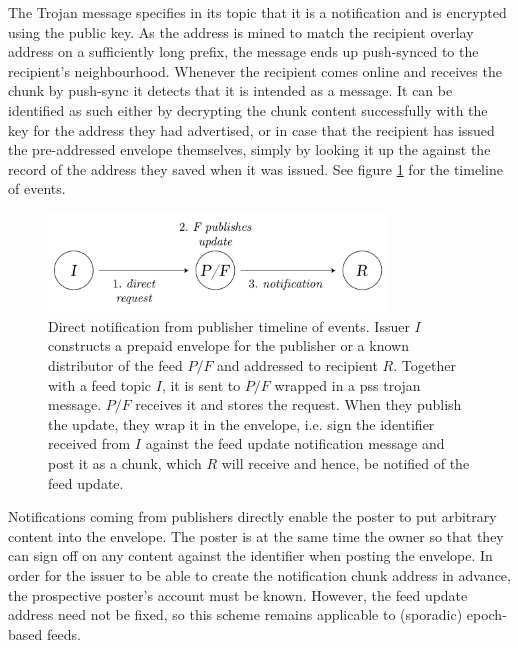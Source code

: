 The Trojan message specifies in its topic that it is a notification and is encrypted using the public key. As the address is mined to match the recipient overlay address on a sufficiently long prefix, the message ends up push-synced to the recipient's neighbourhood. Whenever the recipient comes online and receives the chunk by push-sync it detects that it is intended as a message. It can be identified as such either by decrypting the chunk content successfully with the key for the address they had advertised, or in case that the recipient has issued the pre-addressed envelope themselves, simply by looking it up the against the record of the address they saved when it was issued.  See figure \ref{fig:direct-notification-events} for the timeline of events.


\begin{figure}[htbp]
   \centering
    \includegraphics[width=0.8\textwidth]{fig/direct-notification-events.pdf}
   \caption[Direct notification from publisher timeline of events \statusgreen]{Direct notification from publisher timeline of events. Issuer $I$ constructs a prepaid envelope for the publisher or a known distributor of the feed $P/F$ and addressed to recipient $R$. Together with a feed topic $I$, it is sent to $P/F$ wrapped in a pss trojan message. $P/F$ receives it and stores the request. When they publish the update, they wrap it in the envelope, i.e. sign the identifier received from $I$ against the feed update notification message and post it as a chunk, which $R$ will receive and hence, be notified of the feed update. }
   \label{fig:direct-notification-events}
\end{figure}


Notifications coming from publishers directly enable the poster to put arbitrary content into the envelope. The poster is at the same time the owner so that they can sign off on any content against the identifier when posting the envelope. In order for the issuer to be able to create the notification chunk address in advance, the prospective poster's account must be known. However, the feed update address need not be fixed, so this scheme remains applicable to (sporadic) epoch-based feeds.

